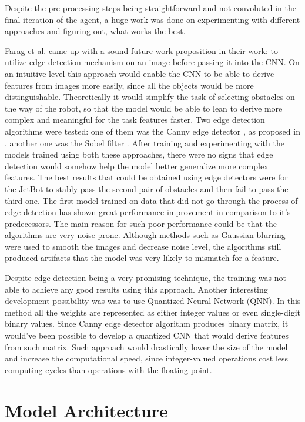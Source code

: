 Despite the pre-processing steps being straightforward and not convoluted in the final iteration of the agent, a huge work was done on experimenting with different approaches and figuring out, what works the best.

Farag et al. \autocite{8855753} came up with a sound future work proposition in their work: to utilize edge detection mechanism on an image before passing it into the CNN. On an intuitive level this approach would enable the CNN to be able to derive features from images more easily, since all the objects would be more distinguishable. Theoretically it would simplify the task of selecting obstacles on the way of the robot, so that the model would be able to lean to derive more complex and meaningful for the task features faster. Two edge detection algorithms were tested: one of them was the Canny edge detector \autocite{canny1986computational}, as proposed in \autocite{8855753}, another one was the Sobel filter \autocite{sobel2014history}. After training and experimenting with the models trained using both these approaches, there were no signs that edge detection would somehow help the model better generalize more complex features. The best results that could be obtained using edge detectors were for the JetBot to stably pass the second pair of obstacles and then fail to pass the third one. The first model trained on data that did not go through the process of edge detection has shown great performance improvement in comparison to it's predecessors. The main reason for such poor performance could be that the algorithms are very noise-prone. Although methods such as Gaussian blurring were used to smooth the images and decrease noise level, the algorithms still produced artifacts that the model was very likely to mismatch for a feature.

Despite edge detection being a very promising technique, the training was not able to achieve any good results using this approach. Another interesting development possibility was was to use Quantized Neural Network (QNN). In this method all the weights are represented as either integer values or even single-digit binary values. Since Canny edge detector algorithm produces binary matrix, it would've been possible to develop a quantized CNN that would derive features from such matrix. Such approach would drastically lower the size of the model and increase the computational speed, since integer-valued operations cost less computing cycles than operations with the floating point.

\section{Model Architecture}


